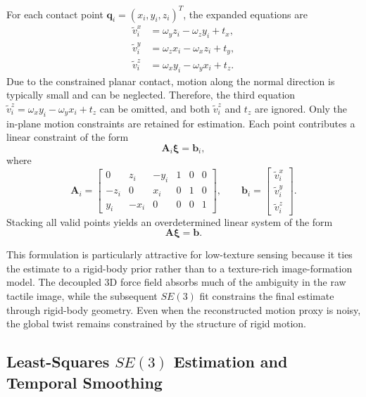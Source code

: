 \documentclass[letterpaper,10pt,journal,twoside]{IEEEtran}
\begin{document}
For each contact point $\mathbf{q}_i = (x_i, y_i, z_i)^T$, the expanded equations are
\begin{equation}
\begin{aligned}
\tilde{v}^x_i &= \omega_y z_i - \omega_z y_i + t_x, \\
\tilde{v}^y_i &= \omega_z x_i - \omega_x z_i + t_y, \\
\tilde{v}^z_i &= \omega_x y_i - \omega_y x_i + t_z.
\end{aligned}
\end{equation}
Due to the constrained planar contact, motion along the normal direction is typically small and can be neglected. Therefore, the third equation 
$\tilde{v}^z_i = \omega_x y_i - \omega_y x_i + t_z$
can be omitted, and both $\tilde{v}^z_i$ and $t_z$ are ignored. Only the in-plane motion constraints are retained for estimation.
Each point contributes a linear constraint of the form
\begin{equation}
\mathbf{A}_i \boldsymbol{\xi} = \mathbf{b}_i,
\end{equation}
where
\begin{equation}
\mathbf{A}_i =
\begin{bmatrix}
0 & z_i & -y_i & 1 & 0 & 0 \\
-z_i & 0 & x_i & 0 & 1 & 0 \\
y_i & -x_i & 0 & 0 & 0 & 1
\end{bmatrix},
\qquad
\mathbf{b}_i =
\begin{bmatrix}
\tilde{v}^x_i \\
\tilde{v}^y_i \\
\tilde{v}^z_i
\end{bmatrix}.
\end{equation}
Stacking all valid points yields an overdetermined linear system of the form
\begin{equation}
\mathbf{A}\boldsymbol{\xi} = \mathbf{b}.
\end{equation}

This formulation is particularly attractive for low-texture sensing because it ties the estimate to a rigid-body prior rather than to a texture-rich image-formation model. The decoupled 3D force field absorbs much of the ambiguity in the raw tactile image, while the subsequent $SE(3)$ fit constrains the final estimate through rigid-body geometry. Even when the reconstructed motion proxy is noisy, the global twist remains constrained by the structure of rigid motion. 

\subsection{Least-Squares \texorpdfstring{$SE(3)$}{SE(3)} Estimation and Temporal Smoothing}
\label{subsec:estimate}
\end{document}
